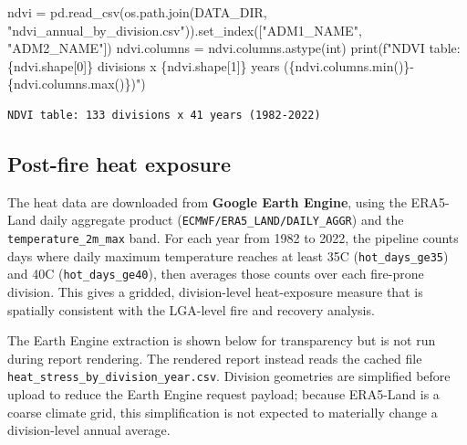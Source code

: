 \documentclass[
  letterpaper,
  DIV=11,
  numbers=noendperiod]{scrartcl}
\newenvironment{Shaded}{\begin{snugshade}}{\end{snugshade}}
\newcommand{\BuiltInTok}[1]{\textcolor[rgb]{0.00,0.23,0.31}{#1}}
\newcommand{\DecValTok}[1]{\textcolor[rgb]{0.68,0.00,0.00}{#1}}
\newcommand{\NormalTok}[1]{\textcolor[rgb]{0.00,0.23,0.31}{#1}}
\newcommand{\OperatorTok}[1]{\textcolor[rgb]{0.37,0.37,0.37}{#1}}
\newcommand{\SpecialCharTok}[1]{\textcolor[rgb]{0.37,0.37,0.37}{#1}}
\newcommand{\SpecialStringTok}[1]{\textcolor[rgb]{0.13,0.47,0.30}{#1}}
\newcommand{\StringTok}[1]{\textcolor[rgb]{0.13,0.47,0.30}{#1}}
\begin{document}
\begin{Shaded}
\begin{Highlighting}[]
\NormalTok{ndvi }\OperatorTok{=}\NormalTok{ pd.read\_csv(os.path.join(DATA\_DIR, }\StringTok{"ndvi\_annual\_by\_division.csv"}\NormalTok{)).set\_index([}\StringTok{"ADM1\_NAME"}\NormalTok{, }\StringTok{"ADM2\_NAME"}\NormalTok{])}
\NormalTok{ndvi.columns }\OperatorTok{=}\NormalTok{ ndvi.columns.astype(}\BuiltInTok{int}\NormalTok{)}
\BuiltInTok{print}\NormalTok{(}\SpecialStringTok{f"NDVI table: }\SpecialCharTok{\{}\NormalTok{ndvi}\SpecialCharTok{.}\NormalTok{shape[}\DecValTok{0}\NormalTok{]}\SpecialCharTok{\}}\SpecialStringTok{ divisions x }\SpecialCharTok{\{}\NormalTok{ndvi}\SpecialCharTok{.}\NormalTok{shape[}\DecValTok{1}\NormalTok{]}\SpecialCharTok{\}}\SpecialStringTok{ years (}\SpecialCharTok{\{}\NormalTok{ndvi}\SpecialCharTok{.}\NormalTok{columns}\SpecialCharTok{.}\BuiltInTok{min}\NormalTok{()}\SpecialCharTok{\}}\SpecialStringTok{{-}}\SpecialCharTok{\{}\NormalTok{ndvi}\SpecialCharTok{.}\NormalTok{columns}\SpecialCharTok{.}\BuiltInTok{max}\NormalTok{()}\SpecialCharTok{\}}\SpecialStringTok{)"}\NormalTok{)}
\end{Highlighting}
\end{Shaded}

\begin{verbatim}
NDVI table: 133 divisions x 41 years (1982-2022)
\end{verbatim}

\subsection{Post-fire heat exposure}\label{post-fire-heat-exposure}

The heat data are downloaded from \textbf{Google Earth Engine}, using
the ERA5-Land daily aggregate product
(\texttt{ECMWF/ERA5\_LAND/DAILY\_AGGR}) and the
\texttt{temperature\_2m\_max} band. For each year from 1982 to 2022, the
pipeline counts days where daily maximum temperature reaches at least
35C (\texttt{hot\_days\_ge35}) and 40C (\texttt{hot\_days\_ge40}), then
averages those counts over each fire-prone division. This gives a
gridded, division-level heat-exposure measure that is spatially
consistent with the LGA-level fire and recovery analysis.

The Earth Engine extraction is shown below for transparency but is not
run during report rendering. The rendered report instead reads the
cached file \texttt{heat\_stress\_by\_division\_year.csv}. Division
geometries are simplified before upload to reduce the Earth Engine
request payload; because ERA5-Land is a coarse climate grid, this
simplification is not expected to materially change a division-level
annual average.
\end{document}
